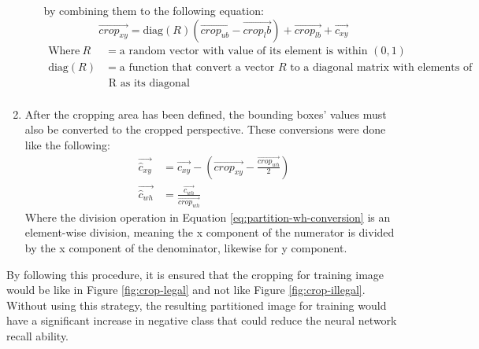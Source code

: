 \begin{enumerate}[topsep=0pt]
\begin{enumerate}
    by combining them to the following equation:
    \begin{equation}
      \overrightarrow{crop_{xy}} = \text{diag}(R)(\overrightarrow{crop_{ub}} - \overrightarrow{crop_lb}) + \overrightarrow{crop_{lb}} + \overrightarrow{c_{xy}}
    \end{equation}
    \begin{align*}
      \text{Where}~R &= \text{a random vector with value of its element is within $(0,1)$}\\
      \text{diag}(R) &= \text{a function that convert a vector $R$ to a diagonal matrix with elements of}\\ &\text{ R as its diagonal}\\
    \end{align*}
  \end{enumerate}
  \item After the cropping area has been defined, the bounding boxes' values must also be converted to the cropped perspective.
  These conversions were done like the following:
  \begin{align}
    \overrightarrow{\hat{c}_{xy}} &= \overrightarrow{c_{xy}} - (\overrightarrow{crop_{xy}} - \frac{\overrightarrow{crop_{wh}}}{2})\\
    \overrightarrow{\hat{c}_{wh}} &= \frac{\overrightarrow{c_{wh}}}{\overrightarrow{crop_{wh}}} \label{eq:partition-wh-conversion}
  \end{align}
  Where the division operation in Equation \ref{eq:partition-wh-conversion} is an element-wise division, meaning the x component of the numerator is divided by the x component of the denominator, likewise for y component.
\end{enumerate}
By following this procedure, it is ensured that the cropping for training image would be like in Figure \ref{fig:crop-legal} and not like Figure \ref{fig:crop-illegal}.
Without using this strategy, the resulting partitioned image for training would have a significant increase in negative class that could reduce the neural network recall ability.

